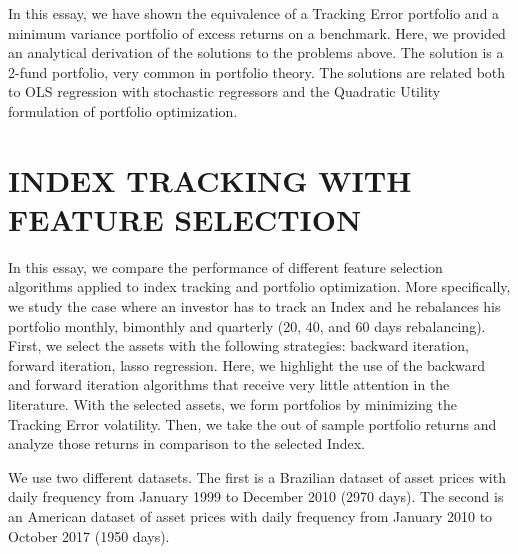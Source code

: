\documentclass[12pt,oneside,a4paper]{memoir}
\begin{document}
In this essay, we have shown the equivalence of a Tracking Error portfolio and a minimum variance portfolio of excess returns on a benchmark.
Here, we provided an analytical derivation of the solutions to the problems above.
The solution is a 2-fund portfolio, very common in portfolio theory.
The solutions are related both to OLS regression with stochastic regressors and the Quadratic Utility formulation of portfolio optimization.

\chapter{INDEX TRACKING WITH FEATURE SELECTION}

In this essay, we compare the performance of different feature selection algorithms applied to index tracking and portfolio optimization.
More specifically, we study the case where an investor has to track an Index and he rebalances his portfolio monthly, bimonthly and quarterly (20, 40, and 60 days rebalancing).
First, we select the assets with the following strategies:
backward iteration, forward iteration, lasso regression.
Here, we highlight the use of the backward and forward iteration algorithms that receive very little attention in the literature.
With the selected assets, we form portfolios by minimizing the Tracking Error volatility.
Then, we take the out of sample portfolio returns and analyze those returns in comparison to the selected Index.

We use two different datasets.
The first is a Brazilian dataset of asset prices with daily frequency from January 1999 to December 2010 (2970 days).
The second is an American dataset of asset prices with daily frequency from January 2010 to October 2017 (1950 days).
\end{document}
